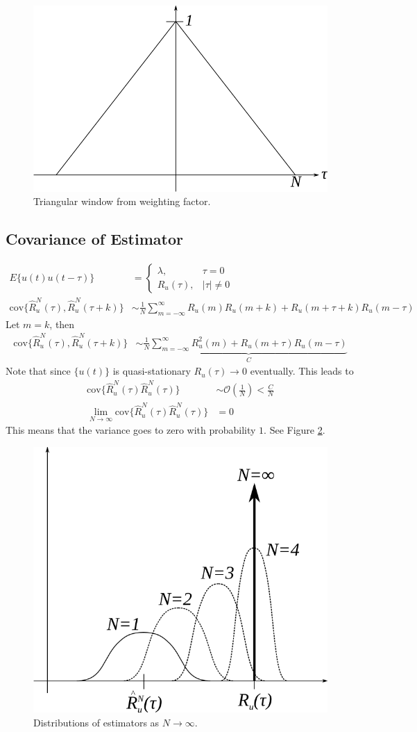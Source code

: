 \documentclass[lecture,12pt,]{pcms-l}
\theoremstyle{example}
\newcommand{\ruhat}{\hat{R}_u^N(\tau)}
\begin{document}
\begin{figure}[ht!]
	\centering
	\includegraphics[width=.4\textwidth]{images/05triWindow}
	\caption{Triangular window from weighting factor.}
	\label{fig:05triWindow}
\end{figure}

\subsection{Covariance of Estimator}
\begin{align*}
E\{u(t)u(t-\tau)\} &= \begin{cases} \lambda, & \tau=0 \\ R_u(\tau), & |\tau|\neq 0 \end{cases} \\
\text{cov}\{\ruhat,\hat{R}_u^N(\tau+k)\} &\sim \frac{1}{N}\sum_{m=-\infty}^\infty R_u(m)R_u(m+k) + R_u(m+\tau+k)R_u(m-\tau)
\end{align*}
Let $m=k$, then
\begin{align*}
\text{cov}\{\ruhat,\hat{R}_u^N(\tau+k)\} &\sim \frac{1}{N}\underbrace{\sum_{m=-\infty}^\infty R_u^2(m) + R_u(m+\tau)R_u(m-\tau)}_C
\end{align*}
Note that since $\{u(t)\}$ is quasi-stationary $R_u(\tau)\to0$ eventually. This leads to
\begin{align*}
\text{cov}\{\ruhat\ruhat\} &\sim \mathcal{O}(\frac{1}{N}) < \frac{C}{N} \\
\lim_{N\to\infty}\text{cov}\{\ruhat\ruhat\} &= 0
\end{align*}
This means that the variance goes to zero with probability $1$. See Figure \ref{fig:05estDist}.
\begin{figure}[ht!]
	\centering
	\includegraphics[width=.5\textwidth]{images/05estDist}
	\caption{Distributions of estimators as $N\to\infty$.}
	\label{fig:05estDist}
\end{figure}
\end{document}
